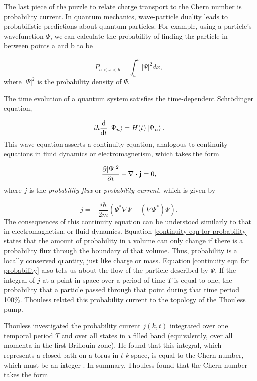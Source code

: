 \documentclass{beavtex_dub_edit}
\begin{document}
The last piece of the puzzle to relate charge transport to the Chern number is probability current. In quantum mechanics, wave-particle duality leads to probabilistic predictions about quantum particles. For example, using a particle's wavefunction $\Psi$, we can calculate the probability of finding the particle in-between points a and b to be 

\begin{equation}
    P_{a<x<b} = \int_{a}^{b} |\Psi|^2dx,
\end{equation}
where $|\Psi|^2$ is the probability density of $\Psi$. 

The time evolution of a quantum system satisfies the time-dependent Schrödinger equation,

\begin{equation}
    i \hbar \derivative{t}\ket{\Psi_n} = H(t)\ket{\Psi_n}.
\end{equation}
This wave equation asserts a continuity equation, analogous to continuity equations in fluid dynamics or electromagnetism, which takes the form \cite{sakurai_modern_1985}

\begin{equation}
    \pdv{|\Psi|^2}{t} -\nabla \dotproduct \vectorbold{j} = 0, \label{continuity eqn for probability}
\end{equation}
where $j$ is the \textit{probability flux} or \textit{probability current}, which is given by

\begin{equation}
    j = -\frac{i \hbar}{2 m}\left(\Psi^* \nabla \Psi - (\nabla \Psi^*)\Psi\right). 
\end{equation}
The consequences of this continuity equation can be understood similarly to that in electromagnetism or fluid dynamics. Equation \ref{continuity eqn for probability} states that the amount of probability in a volume can only change if there is a probability flux through the boundary of that volume. Thus, probability is a locally conserved quantity, just like charge or mass. Equation \ref{continuity eqn for probability} also tells us about the flow of the particle described by $\Psi$. If the integral of $j$ at a point in space over a period of time $T$ is equal to one, the probability that a particle passed through that point during that time period 100\%. Thouless related this probability current to the topology of the Thouless pump.

Thouless investigated the probability current $j(k,t)$ integrated over one temporal period $T$ and over all states in a filled band (equivalently, over all momenta in the first Brillouin zone). He found that this integral, which represents a closed path on a torus in $t \textrm{-} k$ space, is equal to the Chern number, which must be an integer \cite{thouless_quantization_1983}. In summary, Thouless found that the Chern number takes the form
\end{document}
